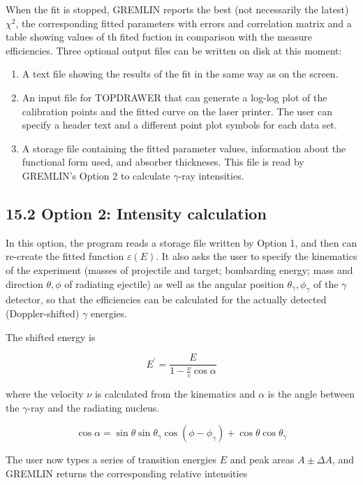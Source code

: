 \documentclass[10pt]{article}
\begin{document}
When the fit is stopped, GREMLIN reports the best (not necessarily the latest) $\chi^{2}$, the corresponding fitted parameters with errors and correlation matrix and a table showing values of th fited fuction in comparison with the measure efficiencies. Three optional output files can be written on disk at this moment:

\begin{enumerate}
  \item A text file showing the results of the fit in the same way as on the screen.
  \item An input file for TOPDRAWER that can generate a log-log plot of the calibration points and the fitted curve on the laser printer. The user can specify a header text and a different point plot symbols for each data set.
  \item A storage file containing the fitted parameter values, information about the functional form used, and absorber thickneses. This file is read by GREMLIN's Option 2 to calculate $\gamma$-ray intensities.
\end{enumerate}

\subsection*{15.2 Option 2: Intensity calculation}
In this option, the program reads a storage file written by Option 1, and then can re-create the fitted function $\varepsilon(E)$. It also asks the user to specify the kinematics of the experiment (masses of projectile and target; bombarding energy; mass and direction $\theta, \phi$ of radiating ejectile) as well as the angular position $\theta_{\gamma}, \phi_{\gamma}$ of the $\gamma$ detector, so that the efficiencies can be calculated for the actually detected (Doppler-shifted) $\gamma$ energies.

The shifted energy is

$$
E^{\prime}=\frac{E}{1-\frac{\nu}{c} \cos \alpha}
$$

where the velocity $\nu$ is calculated from the kinematics and $\alpha$ is the angle between the $\gamma$-ray and the radiating nucleus.

$$
\cos \alpha=\sin \theta \sin \theta_{\gamma} \cos \left(\phi-\phi_{\gamma}\right)+\cos \theta \cos \theta_{\gamma}
$$

The user now types a series of transition energies $E$ and peak areas $A \pm \Delta A$, and GREMLIN returns the corresponding relative intensities
\end{document}
